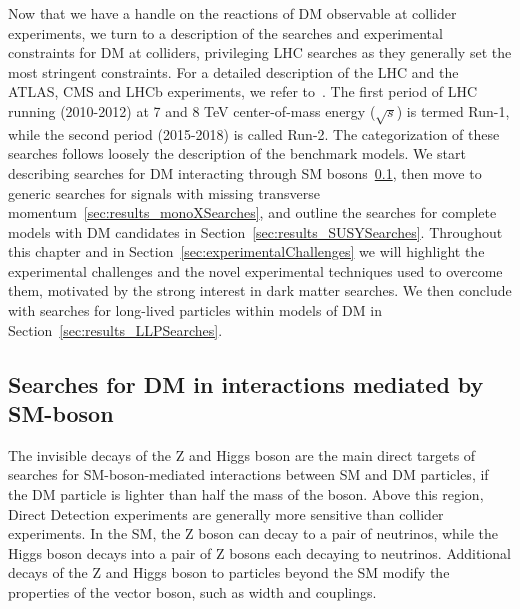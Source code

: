Now that we have a handle on the reactions of DM observable at collider experiments, we turn to a description of the searches and experimental constraints for DM at colliders, privileging LHC searches as they generally set the most stringent constraints. For a detailed description of the LHC and the ATLAS, CMS and LHCb experiments, we refer to~\cite{LHC2008,ATLAS2008,CMS2008}. %
The first period of LHC running (2010-2012) at 7 and 8 TeV center-of-mass energy ($\sqrt{s}$) is termed Run-1, while the second period (2015-2018) is called Run-2. 
The categorization of these searches follows loosely the description of the benchmark models. We start describing searches for DM interacting through SM bosons~\ref{sec:results_ZHSearches}, then move to generic searches for signals with missing transverse momentum~\ref{sec:results_monoXSearches}, and outline the searches for complete models with DM candidates in Section~\ref{sec:results_SUSYSearches}. Throughout this chapter and in Section~\ref{sec:experimentalChallenges} we will highlight the experimental challenges and the novel experimental techniques used to overcome them, motivated by the strong interest in dark matter searches. 
We then conclude with searches for long-lived particles within models of DM in
Section~\ref{sec:results_LLPSearches}. %

\subsection{Searches for DM in interactions mediated by SM-boson}
\label{sec:results_ZHSearches}

The invisible decays of the Z and Higgs boson are the main direct targets of searches for SM-boson-mediated interactions between SM and DM particles, if the DM particle is lighter than half the mass of the boson. Above this region, Direct Detection experiments are generally more sensitive than collider experiments. 
In the SM, the Z boson can decay to a pair of neutrinos, while the Higgs boson decays into a pair of Z bosons each decaying to neutrinos. Additional decays of the Z and Higgs boson to particles beyond the SM modify the properties of the vector boson, such as width and couplings. 


